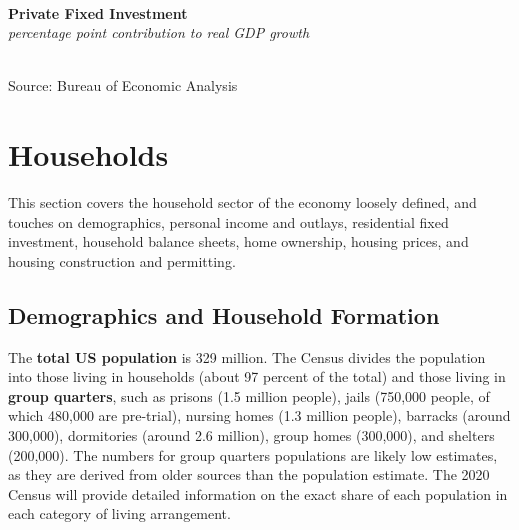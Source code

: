 \documentclass{report}
\makeatletter
\newcommand{\tbllink}[1]{\href{https://raw.githubusercontent.com/bdecon/US-chartbook/master/chartbook/data/#1}{\faTable}}
\newcommand*\short[1]{\expandafter\@gobbletwo\number\numexpr#1\relax}
\newcommand{\sbar}[4]{
		\addplot[ybar stacked, bar width=2.6pt, draw opacity=0, fill=#1] 
			table [x=#2, y=#3, col sep=comma]{#4};}
\newcommand{\dateaxisticks}{
		date coordinates in=x, axis line style={draw=none},
		xmax={2020-05-10},
		max space between ticks=40,	    
		xtick={{1990-01-01}, {1992-01-01}, {1994-01-01}, 
			{1996-01-01}, {1998-01-01}, {2000-01-01}, 
			{2002-01-01}, {2004-01-01}, {2006-01-01},
			{2008-01-01}, {2010-01-01}, {2012-01-01}, {2014-01-01},
		    {2016-01-01}, {2018-01-01}, {2020-01-01}},
		minor xtick={{1989-01-01}, {1991-01-01}, {1993-01-01},
			{1995-01-01}, {1997-01-01}, {1999-01-01}, 
			{2001-01-01}, {2003-01-01}, {2005-01-01}, {2007-01-01},
		    {2009-01-01}, {2011-01-01}, {2013-01-01}, {2015-01-01},
		    {2017-01-01}, {2019-01-01}},
		enlarge y limits={0.06}, enlarge x limits={0.01},
		}
\newcommand{\bbar}[2]{extra #1 ticks = {{#2}}, extra #1 tick labels = ,
		extra #1 tick style = {grid=major, grid style={thick, black!25}},}
\newcommand{\rbars}{
		\fill[color=black!10] (axis cs:{1990-07-01},\pgfkeysvalueof{/pgfplots/ymin}) rectangle 
			(axis cs:{1991-03-01}, \pgfkeysvalueof{/pgfplots/ymax});
		\fill[color=black!10] (axis cs:{2007-12-01},\pgfkeysvalueof{/pgfplots/ymin}) rectangle 
			(axis cs:{2009-07-01}, \pgfkeysvalueof{/pgfplots/ymax});
		\fill[color=black!10] (axis cs:{2001-03-01},\pgfkeysvalueof{/pgfplots/ymin}) rectangle 
			(axis cs:{2001-11-01}, \pgfkeysvalueof{/pgfplots/ymax});}
\makeatother
\begin{document}
{{{\begin{minipage}{0.76\textwidth}
 \\

\vspace{4mm} 

\noindent \normalsize \textbf{Private Fixed Investment}\\
\footnotesize{\textit{percentage point contribution to real GDP growth}}\\
\noindent \hspace*{-3mm} \\
\footnotesize{Source: Bureau of Economic Analysis} \hfill \tbllink{inv.csv} 

\end{minipage}

\newpage
\section*{\color{darkgray}\LARGE Households}
\label{sec:hh}

\begin{minipage}{0.76\textwidth}
\small This section covers the household sector of the economy loosely defined, and touches on demographics, personal income and outlays, residential fixed investment, household balance sheets, home ownership, housing prices, and housing construction and permitting.


\subsection*{\color{black!70} \seriffont Demographics and Household Formation}

The \textbf{total US population} is 329 million. The Census divides the population into those living in households (about 97 percent of the total) and those living in \textbf{group quarters}, such as prisons (1.5 million people), jails (750,000 people, of which 480,000 are pre-trial), nursing homes (1.3 million people), barracks (around 300,000), dormitories (around 2.6 million), group homes (300,000), and shelters (200,000). The numbers for group quarters populations are likely low estimates, as they are derived from older sources than the population estimate. The 2020 Census will provide detailed information on the exact share of each population in each category of living arrangement.\\ 


\end{minipage}}}}
\end{document}
